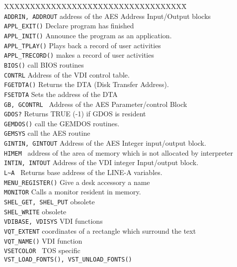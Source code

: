 \begin{tabbing}
XXXXXXXXXXXXXXXXX\=XXXXXXXXXXXXXXXXXX\=\kill\\
\verb|ADDRIN, ADDROUT|\> address of the AES Address Input/Output blocks\\
\verb|APPL_EXIT()|\>	Declare program has finished\\
\verb|APPL_INIT()|\>	Announce the program as an application.\\
\verb|APPL_TPLAY()|\>	Plays back a record of user activities\\
\verb|APPL_TRECORD()|\>	makes a record of user activities\\
\verb|BIOS()|\>		call BIOS routines\\
\verb|CONTRL|\>		Address of the VDI control table.\\
\verb|FGETDTA()|\>	Returns the DTA (Disk Transfer Address).\\
\verb|FSETDTA|\> 	Sets the address of the DTA\\
\verb|GB, GCONTRL |\>    Address of the AES Parameter/control Block\\
\verb|GDOS?|\>		Returns  TRUE  (-1)  if GDOS is  resident\\
\verb|GEMDOS()|\>	call the GEMDOS routines.\\
\verb|GEMSYS|\>		call the AES routine\\
\verb|GINTIN, GINTOUT|\> Address of the AES Integer input/output block.\\
\verb|HIMEM |\>         	address of the area of memory which is not allocated by interpreter\\
\verb|INTIN, INTOUT|\>   Address of the VDI integer Input/output block.\\
\verb|L~A |\>           	Returns base address of the LINE-A variables.\\
\verb|MENU_REGISTER()|\> Give a desk accessory a name\\
\verb|MONITOR|\>        	Calls a monitor resident in memory.\\
\verb|SHEL_GET, SHEL_PUT|\>  	obsolete\\
\verb|SHEL_WRITE|\>	obsolete\\
\verb|VDIBASE, VDISYS|\> VDI  functions\\
\verb|VQT_EXTENT|\>     	coordinates of a rectangle  which surround the text\\
\verb|VQT_NAME()|\>     	VDI  function\\
\verb|VSETCOLOR |\>     	TOS specific\\
\verb|VST_LOAD_FONTS(), VST_UNLOAD_FONTS()|\\

\end{tabbing}

